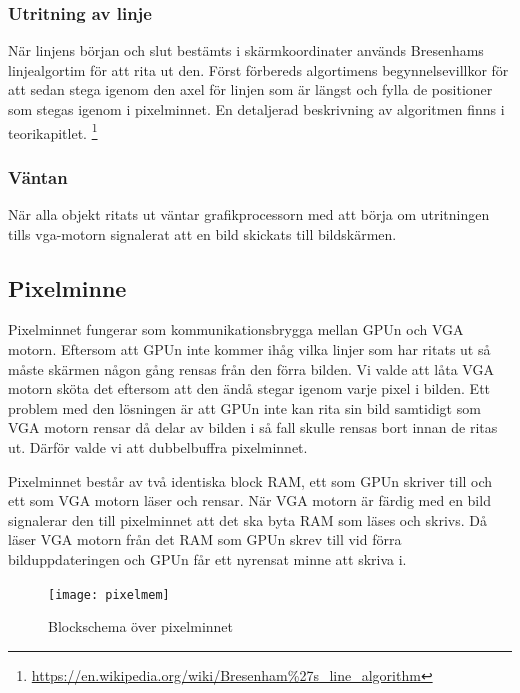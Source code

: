 \documentclass[a4paper]{article}
\begin{document}
    \subsubsection{Utritning av linje}
    När linjens början och slut bestämts i skärmkoordinater används Bresenhams
    linjealgortim för att rita ut den. Först förbereds algortimens
    begynnelsevillkor för att sedan stega igenom den axel för linjen som är
    längst och fylla de positioner som stegas igenom i pixelminnet. En
    detaljerad beskrivning av algoritmen finns i teorikapitlet.
    \footnote{\url{https://en.wikipedia.org/wiki/Bresenham\%27s\_line\_algorithm}}

    \subsubsection{Väntan}

    När alla objekt ritats ut väntar grafikprocessorn med att börja om
    utritningen tills vga-motorn signalerat att en bild skickats till
    bildskärmen. 

    \subsection{Pixelminne}

    Pixelminnet fungerar som kommunikationsbrygga mellan GPUn och VGA motorn.
    Eftersom att GPUn inte kommer ihåg vilka linjer som har ritats ut så måste
    skärmen någon gång rensas från den förra bilden. Vi valde att låta VGA motorn
    sköta det eftersom att den ändå stegar igenom varje pixel i bilden. Ett problem
    med den lösningen är att GPUn inte kan rita sin bild samtidigt som VGA motorn
    rensar då delar av bilden i så fall skulle rensas bort innan de ritas ut. Därför
    valde vi att dubbelbuffra pixelminnet. 

    Pixelminnet består av två identiska block RAM, ett som GPUn skriver till och ett
    som VGA motorn läser och rensar. När VGA motorn är färdig med en bild signalerar
    den till pixelminnet att det ska byta RAM som läses och skrivs. Då läser VGA
    motorn från det RAM som GPUn skrev till vid förra bilduppdateringen och GPUn får
    ett nyrensat minne att skriva i. 

    \begin{figure}[H]
        \centering
        \texttt{[image: pixelmem]}
        \caption{Blockschema över pixelminnet}
        \label{fig:pixelmem}
    \end{figure}
\end{document}
